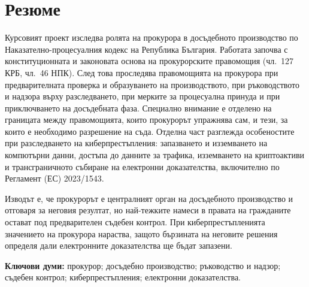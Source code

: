 \section*{Резюме}
\label{sec:rezyume}

Курсовият проект изследва ролята на прокурора в досъдебното производство по
Наказателно-процесуалния кодекс на Република България. Работата започва с
конституционната и законовата основа на прокурорските правомощия (чл.~127 КРБ, чл.~46
НПК). След това проследява правомощията на прокурора при предварителната проверка и
образуването на производството, при ръководството и надзора върху разследването, при
мерките за процесуална принуда и при приключването на досъдебната фаза. Специално
внимание е отделено на границата между правомощията, които прокурорът упражнява сам, и
тези, за които е необходимо разрешение на съда. Отделна част разглежда особеностите при
разследването на киберпрестъпления: запазването и изземването на компютърни данни,
достъпа до данните за трафика, изземването на криптоактиви и трансграничното събиране на
електронни доказателства, включително по Регламент (ЕС) 2023/1543.

Изводът е, че прокурорът е централният орган на досъдебното производство и отговаря за
неговия резултат, но най-тежките намеси в правата на гражданите остават под
предварителен съдебен контрол. При киберпрестъпленията значението на прокурора нараства,
защото бързината на неговите решения определя дали електронните доказателства ще бъдат
запазени.

\medskip
\noindent\textbf{Ключови думи:} прокурор; досъдебно производство; ръководство и надзор;
съдебен контрол; киберпрестъпления; електронни доказателства.
